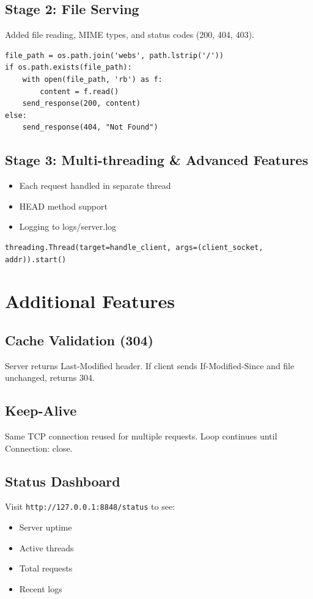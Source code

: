 \documentclass[12pt,a4paper]{article}
\begin{document}
\subsection{Stage 2: File Serving}
Added file reading, MIME types, and status codes (200, 404, 403).

\begin{lstlisting}[caption=File Serving]
file_path = os.path.join('webs', path.lstrip('/'))
if os.path.exists(file_path):
    with open(file_path, 'rb') as f:
        content = f.read()
    send_response(200, content)
else:
    send_response(404, "Not Found")
\end{lstlisting}

\subsection{Stage 3: Multi-threading \& Advanced Features}
\begin{itemize}
    \item Each request handled in separate thread
    \item HEAD method support
    \item Logging to logs/server.log
\end{itemize}

\begin{lstlisting}[caption=Multi-threading]
threading.Thread(target=handle_client, args=(client_socket, addr)).start()
\end{lstlisting}

\section{Additional Features}

\subsection{Cache Validation (304)}
Server returns Last-Modified header. If client sends If-Modified-Since and file unchanged, returns 304.

\subsection{Keep-Alive}
Same TCP connection reused for multiple requests. Loop continues until Connection: close.

\subsection{Status Dashboard}
Visit \texttt{http://127.0.0.1:8848/status} to see:
\begin{itemize}
    \item Server uptime
    \item Active threads
    \item Total requests
    \item Recent logs
\end{itemize}
\end{document}
